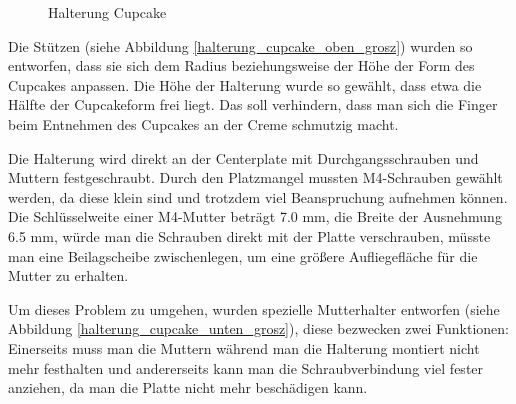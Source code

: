 			\begin{figure}[H]
			  \begin{centering}
			  \par\end{centering}
			  \caption{Halterung Cupcake}
			  \label{Halterung_Cupcake}
			\end{figure}

	Die Stützen (siehe Abbildung \ref{halterung_cupcake_oben_grosz}) wurden so entworfen, dass sie sich dem Radius beziehungsweise der Höhe der Form des Cupcakes anpassen.
	Die Höhe der Halterung wurde so gewählt, dass etwa die Hälfte der Cupcakeform frei liegt.
	Das soll verhindern, dass man sich die Finger beim Entnehmen des Cupcakes an der Creme schmutzig macht.

	Die Halterung wird direkt an der Centerplate mit Durchgangsschrauben und Muttern festgeschraubt.
	Durch den Platzmangel mussten M4-Schrauben gewählt werden, da diese klein sind und trotzdem viel Beanspruchung aufnehmen können.
	Die Schlüsselweite einer M4-Mutter beträgt 7.0 mm, die Breite der Ausnehmung 6.5 mm, würde man die Schrauben direkt mit der Platte verschrauben, müsste man eine Beilagscheibe zwischenlegen, um eine größere Aufliegefläche für die Mutter zu erhalten.

	Um dieses Problem zu umgehen, wurden spezielle Mutterhalter entworfen (siehe Abbildung \ref{halterung_cupcake_unten_grosz}), diese bezwecken zwei Funktionen:
	Einerseits muss man die Muttern während man die Halterung montiert nicht mehr festhalten und andererseits kann man die Schraubverbindung viel fester anziehen, da man die Platte nicht mehr beschädigen kann.

